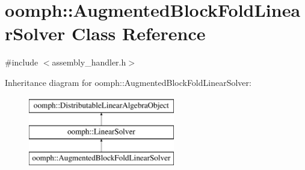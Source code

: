 \hypertarget{classoomph_1_1AugmentedBlockFoldLinearSolver}{}\section{oomph\+:\+:Augmented\+Block\+Fold\+Linear\+Solver Class Reference}
\label{classoomph_1_1AugmentedBlockFoldLinearSolver}


{\ttfamily \#include $<$assembly\+\_\+handler.\+h$>$}

Inheritance diagram for oomph\+:\+:Augmented\+Block\+Fold\+Linear\+Solver\+:\begin{figure}[H]
\begin{center}
\leavevmode
\includegraphics[height=3.000000cm]{classoomph_1_1AugmentedBlockFoldLinearSolver}
\end{center}
\end{figure}
